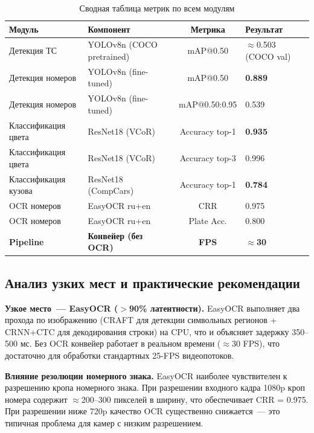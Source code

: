 \documentclass[14pt,a4paper]{report}
\numberwithin{equation}{chapter}
\numberwithin{figure}{chapter}
\numberwithin{table}{chapter}
\begin{document}
\begin{table}[H]
\centering
\caption{Сводная таблица метрик по всем модулям}
\label{tab:final_summary}
\begin{tabularx}{\textwidth}{lXcX}
\toprule
\textbf{Модуль} & \textbf{Компонент} & \textbf{Метрика} & \textbf{Результат} \\
\midrule
Детекция ТС         & YOLOv8n (COCO pretrained) & mAP@0.50       & $\approx$0.503 (COCO val) \\
Детекция номеров    & YOLOv8n (fine-tuned)      & mAP@0.50       & \textbf{0.889} \\
Детекция номеров    & YOLOv8n (fine-tuned)      & mAP@0.50:0.95  & 0.539 \\
Классификация цвета & ResNet18 (VCoR)           & Accuracy top-1 & \textbf{0.935} \\
Классификация цвета & ResNet18 (VCoR)           & Accuracy top-3 & 0.996 \\
Классификация кузова& ResNet18 (CompCars)       & Accuracy top-1 & \textbf{0.784} \\
OCR номеров         & EasyOCR ru+en             & CRR            & 0.975 \\
OCR номеров         & EasyOCR ru+en             & Plate Acc.     & 0.800 \\
\textbf{Pipeline}   & \textbf{Конвейер (без OCR)} & \textbf{FPS} & $\approx$\textbf{30} \\
\bottomrule
\end{tabularx}
\end{table}

\subsection{Анализ узких мест и практические рекомендации}

\textbf{Узкое место~--- EasyOCR ($>$90\% латентности).}
EasyOCR выполняет два прохода по изображению (CRAFT для
детекции символьных регионов + CRNN+CTC для декодирования строки)
на CPU, что и объясняет задержку 350--500 мс. Без OCR конвейер
работает в реальном времени ($\approx$30 FPS), что достаточно
для обработки стандартных 25-FPS видеопотоков.

\textbf{Влияние резолюции номерного знака.}
EasyOCR наиболее чувствителен к разрешению кропа номерного знака.
При разрешении входного кадра 1080p кроп номера содержит $\approx$200--300
пикселей в ширину, что обеспечивает CRR = 0.975. При разрешении
ниже 720p качество OCR существенно снижается~--- это типичная проблема
для камер с низким разрешением.
\end{document}
